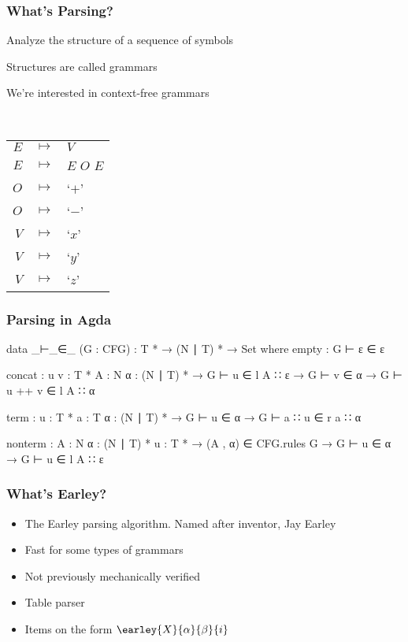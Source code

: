 \begin{frame}
	\frametitle{What's Parsing?}

	\begin{itemize*}
		\item Analyze the structure of a sequence of symbols
		\item Structures are called grammars
		\item We're interested in context-free grammars
	\end{itemize*}\\
	\vspace{0.5cm}
	\centering
	\begin{tabular}{rcl}
		$E$ & $ \mapsto $ & $V$ \\
		$E$ & $ \mapsto $ & $E$ $O$ $E$ \\
		$O$ & $ \mapsto $ & `$+$' \\
		$O$ & $ \mapsto $ & `$-$' \\
		$V$ & $ \mapsto $ & `$x$' \\
		$V$ & $ \mapsto $ & `$y$' \\
		$V$ & $ \mapsto $ & `$z$'
	\end{tabular}
\end{frame}

\begin{frame}
	\frametitle{Parsing in Agda}
	\begin{code}
		data _⊢_∈_ (G : CFG) :  T * → (N ∣ T) * → Set where
		  empty :
		    G ⊢ ε ∈ ε

		  concat : {u v : T *} {A : N} {α : (N ∣ T) *} →
		    G ⊢ u ∈ l A ∷ ε → G ⊢ v ∈ α → G ⊢ u ++ v ∈ l A ∷ α

		  term : {u : T *} {a : T} {α : (N ∣ T) *} →
		    G ⊢ u ∈ α → G ⊢ a ∷ u ∈ r a ∷ α

		  nonterm : {A : N} {α : (N ∣ T) *} {u : T *} →
		    (A , α) ∈ CFG.rules G → G ⊢ u ∈ α → G ⊢ u ∈ l A ∷ ε
	\end{code}
\end{frame}

\begin{frame}
	\frametitle{What's Earley?}

	\begin{itemize}
		\item The Earley parsing algorithm. Named after inventor, Jay Earley
		\item Fast for some types of grammars
		\item Not previously mechanically verified
		\item Table parser
		\item Items on the form $\earley{X}{\alpha}{\beta}{i}$
	\end{itemize}
\end{frame}

